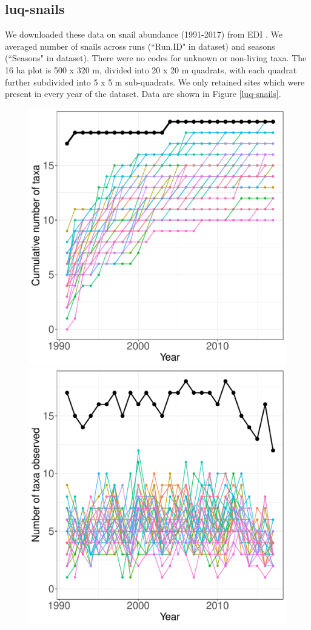 \documentclass[11pt, oneside]{article}
\begin{document}
\subsection{luq-snails}
We downloaded these data on snail abundance (1991-2017) from EDI \citep{luq-snails}.
We averaged number of snails across runs (``Run.ID" in dataset) and seasons (``Seasons" in dataset). 
There were no codes for unknown or non-living taxa.
The 16 ha plot is 500 x 320 m, divided into 20 x 20 m quadrats, with each quadrat further subdivided into 5 x 5 m sub-quadrats. 
We only retained sites which were present in every year of the dataset.
Data are shown in Figure \ref{luq-snails}.

\begin{figure}[h!]
\centering
\includegraphics[scale = 0.4]{luq-snails-compagnoni_species_accumulation_curve.pdf}
\includegraphics[scale = 0.4]{luq-snails-compagnoni_num_taxa_over_time.pdf}

\end{figure}
\end{document}
